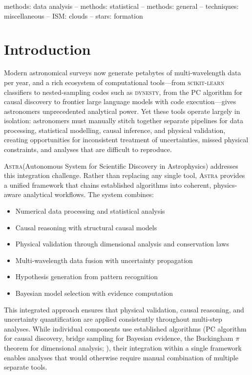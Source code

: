 \documentclass[usenatbib]{rasti}
\newcommand{\astra}{\textsc{Astra}\xspace}
\newcommand{\pc}{PC\xspace}
\begin{document}
\begin{keywords}
methods: data analysis -- methods: statistical -- methods: general -- techniques: miscellaneous -- ISM: clouds -- stars: formation
\end{keywords}

\section{Introduction}
\label{sec:introduction}

Modern astronomical surveys now generate petabytes of multi-wavelength data per year, and a rich ecosystem of computational tools---from \textsc{scikit-learn} classifiers to nested-sampling codes such as \textsc{dynesty}, from the \pc algorithm for causal discovery \citep{Spirtes2000} to frontier large language models with code execution---gives astronomers unprecedented analytical power.
Yet these tools operate largely in isolation: astronomers must manually stitch together separate pipelines for data processing, statistical modelling, causal inference, and physical validation, creating opportunities for inconsistent treatment of uncertainties, missed physical constraints, and analyses that are difficult to reproduce.

\astra (Autonomous System for Scientific Discovery in Astrophysics) addresses this integration challenge.
Rather than replacing any single tool, \astra provides a unified framework that chains established algorithms into coherent, physics-aware analytical workflows.
The system combines:
\begin{itemize}
  \item Numerical data processing and statistical analysis
  \item Causal reasoning with structural causal models
  \item Physical validation through dimensional analysis and conservation laws
  \item Multi-wavelength data fusion with uncertainty propagation
  \item Hypothesis generation from pattern recognition
  \item Bayesian model selection with evidence computation
\end{itemize}

This integrated approach ensures that physical validation, causal reasoning, and uncertainty quantification are applied consistently throughout multi-step analyses.
While individual components use established algorithms (\pc algorithm for causal discovery, bridge sampling for Bayesian evidence, the Buckingham $\pi$ theorem for dimensional analysis; \citealt{Buckingham1914}), their integration within a single framework enables analyses that would otherwise require manual combination of multiple separate tools.
\end{document}
